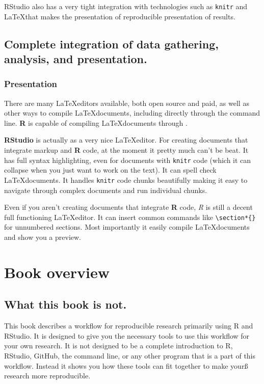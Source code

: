 \documentclass[ChapterTOCs,krantz1]{krantz}\usepackage{graphicx, color}
\begin{document}
RStudio also has a very tight integration with technologies such as {\tt{knitr}} and \LaTeX that makes the presentation of reproducible presentation of results. 

\subsection{Complete integration of data gathering, analysis, and
presentation.}

\subsubsection{Presentation}

There are many \LaTeX editors available, both open source and paid, as
well as other ways to compile \LaTeX documents, including directly
through the command line. \textbf{R} is capable of compiling
\LaTeX documents through .

\textbf{RStudio} is actually as a very nice \LaTeX editor. For creating
documents that integrate markup and \textbf{R} code, at the moment it
pretty much can't be beat. It has full syntax highlighting, even for
documents with \texttt{knitr} code (which it can collapse when you just
want to work on the text). It can spell check \LaTeX documents. It
handles \texttt{knitr} code chunks beautifully making it easy to
navigate through complex documents and run individual chunks.

Even if you aren't creating documents that integrate \textbf{R} code,
\emph{R} is still a decent full functioning \LaTeX editor. It can insert
common commands like \texttt{\textbackslash{}section*\{\}} for
unnumbered sections. Most importantly it easily compile \LaTeX documents
and show you a preview.

\section{Book overview}

\subsection{What this book is not.}\label{WhatNot}

This book describes a workflow for reproducible research primarily using
R and RStudio. It is designed to give you the
necessary tools to use this workflow for your own research. It is not
designed to be a complete introduction to R, RStudio,
GitHub, the command line, or any other program that is a part
of this workflow. Instead it shows you how these tools can fit together
to make yourß research more reproducible.
\end{document}
